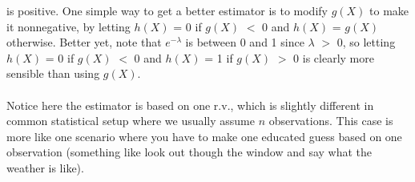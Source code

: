 \begin{exercise} [BH.4.66]
\begin{solution}
\begin{enumerate}
{    		is positive. One simple way to get a better estimator is to modify $g(X)$ to make it nonnegative, by letting $h(X)$ = 0 if $g(X)$ $<$ 0 and $h(X)$ = $g(X)$ otherwise.
    		Better yet, note that $e^{-\lambda}$ is between 0 and 1 since $\lambda$ $>$ 0, so letting $h(X)$ = 0 if
    		$g(X)$ $<$ 0 and $h(X)$ = 1 if $g(X)$ $>$ 0 is clearly more sensible than using $g(X)$.} \\~\\
    	Notice here the estimator is based on one r.v., which is slightly different in common statistical setup where we usually assume $n$ observations. This case is more like one scenario where you have to make one educated guess based on one observation (something like look out though the window and say what the weather is like). 
	\end{enumerate}
\end{solution}
\end{exercise}

